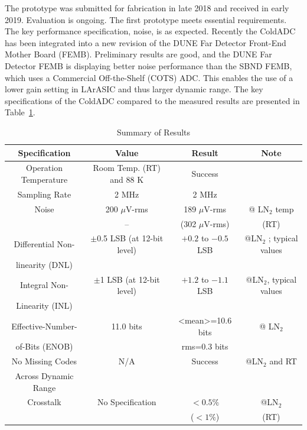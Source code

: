 The prototype was submitted for fabrication in late 2018 and received in early 2019. Evaluation is ongoing. 
The first prototype meets essential requirements. The key performance specification, noise, is as expected. Recently the ColdADC has been integrated into a new revision of the DUNE Far Detector Front-End Mother Board (FEMB). Preliminary results are good, and the DUNE Far Detector FEMB is displaying better noise performance than the SBND FEMB, which uses a Commercial Off-the-Shelf (COTS) ADC. This enables the use of a lower gain setting in LArASIC and thus larger dynamic range. The key specifications of the ColdADC compared to the measured results are presented in Table~\ref{tab:coldadc_specs}.
\begin{table}[h]
\centering
\begin{tabular}{|c|c|c|c|}
\hline
\textbf{ Specification } & \textbf{Value} & \textbf{Result} & \textbf{Note}  \\ \hline \hline
Operation Temperature &  Room Temp. (RT) and 88 K & Success & \\ \hline
Sampling Rate & 2 MHz & 2 MHz & \\ \hline
Noise & 200 $\mu$V-rms & 189 $\mu$V-rms & @ LN$_2$ temp \\ 
      &    --            & (302 $\mu$V-rms) & (RT) \\ \hline
Differential Non- & $\pm$0.5 LSB (at 12-bit level) & $+0.2$ to $-0.5$ LSB & @LN$_2$ ; typical values \\
linearity (DNL) & & &  \\ \hline
Integral Non- & $\pm$1 LSB (at 12-bit level) & $+1.2$ to $-1.1$ LSB & @LN$_2$, typical values \\
Linearity (INL) & & &  \\ \hline
Effective-Number- & 11.0 bits & <mean>=10.6 bits & @ LN$_2$ \\ 
of-Bits (ENOB) & & rms=0.3 bits & \\ \hline
No Missing Codes & N/A & Success & @LN$_2$ and RT \\ 
Across Dynamic Range & & & \\ \hline
Crosstalk  & No Specification & $<0.5\%$ & @LN$_2$ \\ 
           &                  & ($<1\%$) &  (RT) \\ \hline
\end{tabular}
\caption{Summary of Results}
\label{tab:coldadc_specs}
\end{table}  

